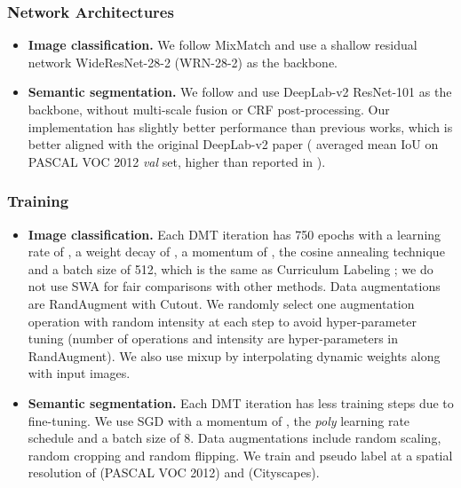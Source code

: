 \documentclass[preprint,review,10pt]{elsarticle}
\begin{document}
\subsubsection{Network Architectures}
\label{sec:521}

\begin{itemize}
    \item \textbf{Image classification.} We follow MixMatch \cite{berthelot2020remixmatch} and use a shallow residual network WideResNet-28-2 (WRN-28-2) \cite{zagoruyko2016wide} as the backbone.
    \item \textbf{Semantic segmentation.} We follow \cite{mittal2019semi,hung} and use DeepLab-v2 ResNet-101 \cite{deeplabv2} as the backbone, without multi-scale fusion or CRF post-processing. Our implementation has slightly better performance than previous works, which is better aligned with the original DeepLab-v2 paper ( averaged mean IoU on PASCAL VOC 2012 \textit{val} set, higher than  reported in \cite{hung}).
\end{itemize}

\subsubsection{Training}
\label{sec:522}

\begin{itemize}
    \item \textbf{Image classification.} Each DMT iteration has 750 epochs with a learning rate of , a weight decay of , a momentum of , the cosine annealing technique and a batch size of 512, which is the same as Curriculum Labeling \cite{cascante2020curriculum}; we do not use SWA \cite{izmailov2018averaging} for fair comparisons with other methods. Data augmentations are RandAugment \cite{cubuk2020randaugment} with Cutout. We randomly select one augmentation operation with random intensity at each step to avoid hyper-parameter tuning (number of operations  and intensity  are hyper-parameters in RandAugment). We also use mixup \cite{zhang2018mixup} by interpolating dynamic weights along with input images.
    \item \textbf{Semantic segmentation.} Each DMT iteration has less training steps due to fine-tuning. We use SGD with a momentum of , the \emph{poly} learning rate schedule and a batch size of 8. Data augmentations include random scaling, random cropping and random flipping. We train and pseudo label at a spatial resolution of  (PASCAL VOC 2012) and  (Cityscapes).
\end{itemize}
\end{document}
